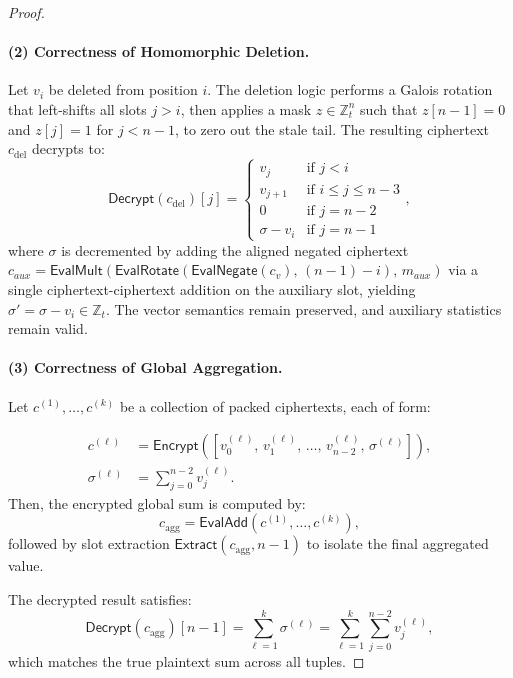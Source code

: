 \documentclass[sigconf,nonacm]{acmart}
\begin{document}
\begin{proof}
\paragraph{(2) Correctness of Homomorphic Deletion.}
Let $v_i$ be deleted from position $i$. The deletion logic performs a Galois rotation that left-shifts all slots $j > i$, then applies a mask $z \in \mathbb{Z}_t^n$ such that $z[n{-}1] = 0$ and $z[j] = 1$ for $j < n-1$, to zero out the stale tail. The resulting ciphertext $c_{\text{del}}$ decrypts to:
\[
\mathsf{Decrypt}(c_{\text{del}})[j] =
\begin{cases}
v_j & \text{if } j < i \\
v_{j+1} & \text{if } i \leq j \leq n-3 \\
0 & \text{if } j = n-2 \\
\sigma - v_i & \text{if } j = n-1
\end{cases},
\]
where $\sigma$ is decremented by adding the aligned negated ciphertext $c_{\mathit{aux}} = \mathsf{EvalMult}(\mathsf{EvalRotate}(\mathsf{EvalNegate}(c_v),\, (n-1)-i),\, m_{\mathit{aux}})$ via a single ciphertext-ciphertext addition on the auxiliary slot,
yielding $\sigma' = \sigma - v_i \in \mathbb{Z}_t$. The vector semantics remain preserved, and auxiliary statistics remain valid.

\paragraph{(3) Correctness of Global Aggregation.}
Let $c^{(1)}, \dots, c^{(k)}$ be a collection of packed ciphertexts, each of form:

\[
\begin{aligned}
c^{(\ell)} &= \mathsf{Encrypt}\left(
  \left[
    v^{(\ell)}_0,\, v^{(\ell)}_1,\, \dots,\, v^{(\ell)}_{n-2},\, \sigma^{(\ell)}
  \right]
\right), \\
\sigma^{(\ell)} &= \sum_{j=0}^{n-2} v^{(\ell)}_j.
\end{aligned}
\]
Then, the encrypted global sum is computed by:
\[
c_{\text{agg}} = \mathsf{EvalAdd}(c^{(1)}, \dots, c^{(k)}),
\]
followed by slot extraction $\mathsf{Extract}(c_{\text{agg}}, n-1)$ to isolate the final aggregated value. 

The decrypted result satisfies:
\[
\mathsf{Decrypt}(c_{\text{agg}})[n-1] = \sum_{\ell = 1}^{k} \sigma^{(\ell)} = \sum_{\ell = 1}^{k} \sum_{j=0}^{n-2} v_j^{(\ell)},
\]
which matches the true plaintext sum across all tuples.
\end{proof}
\end{document}
